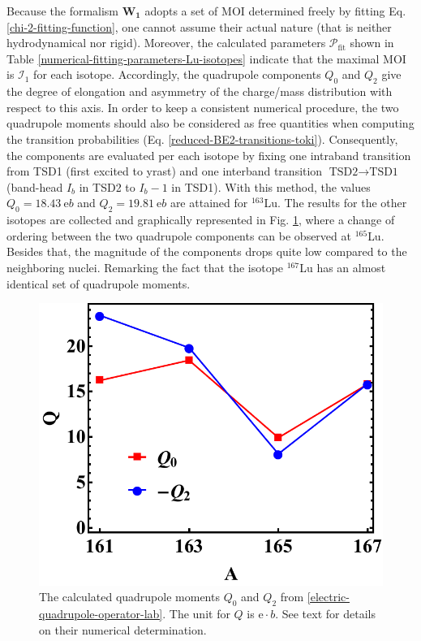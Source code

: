 Because the formalism $\mathbf{W_1}$ adopts a set of MOI determined freely by fitting Eq. \ref{chi-2-fitting-function}, one cannot assume their actual nature (that is neither hydrodynamical nor rigid). Moreover, the calculated parameters $\mathcal{P}_\text{fit}$ shown in Table \ref{numerical-fitting-parameters-Lu-isotopes} indicate that the maximal MOI is $\mathcal{I}_1$ for each isotope. Accordingly, the quadrupole components $Q_{0}$ and $Q_{2}$ give the degree of elongation and asymmetry of the charge/mass distribution with respect to this axis. In order to keep a consistent numerical procedure, the two quadrupole moments should also be considered as free quantities when computing the transition probabilities (Eq. \ref{reduced-BE2-transitions-toki}). Consequently, the components are evaluated per each isotope by fixing one intraband transition from TSD1 (first excited to yrast) and one interband transition $\text{TSD2}\to\text{TSD1}$ (band-head $I_b$ in TSD2 to $I_b-1$ in TSD1). With this method, the values $Q_0=18.43\ \mathrm{e}b$ and $Q_2=19.81\ \mathrm{e}b$ are attained for $^{163}$Lu. The results for the other isotopes are collected and graphically represented in Fig. \ref{quadrupole-moments-fit-numerical-results}, where a change of ordering between the two quadrupole components can be observed at $^{165}$Lu. Besides that, the magnitude of the components drops quite low compared to the neighboring nuclei. Remarking the fact that the isotope $^{167}$Lu has an almost identical set of quadrupole moments.
\begin{figure}
    \centering
    \includegraphics[scale=0.65]{Chapters/Figures/Lu-exp-energies/fig19.pdf}
    \caption{The calculated quadrupole moments $Q_0$ and $Q_2$ from \ref{electric-quadrupole-operator-lab}. The unit for $Q$ is $\mathrm{e}\cdot b$. See text for details on their numerical determination.}
    \label{quadrupole-moments-fit-numerical-results}
\end{figure}

